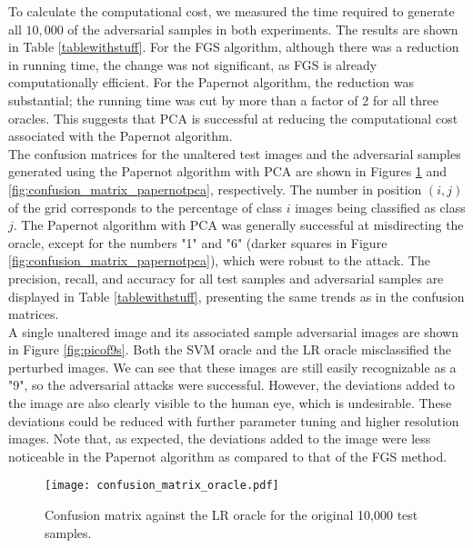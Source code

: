 \indent To calculate the computational cost, we measured the time required to generate all $10,000$ of the adversarial samples in both experiments. The results are shown in Table \ref{tablewithstuff}. For the FGS algorithm, although there was a reduction in running time, the change was not significant, as FGS is already computationally efficient. For the Papernot algorithm, the reduction was substantial; the running time was cut by more than a factor of 2 for all three oracles. This suggests that PCA is successful at reducing the computational cost associated with the Papernot algorithm.\\
\indent The confusion matrices for the unaltered test images and the adversarial samples generated using the Papernot algorithm with PCA are shown in Figures \ref{fig:confusion_matrix_oracle} and \ref{fig:confusion_matrix_papernotpca}, respectively. The number in position $(i, j)$ of the grid corresponds to the percentage of class $i$ images being classified as class $j$. The Papernot algorithm with PCA was generally successful at misdirecting the oracle, except for the numbers "1" and "6" (darker squares in Figure \ref{fig:confusion_matrix_papernotpca}), which were robust to the attack. The precision, recall, and accuracy for all test samples and adversarial samples are displayed in Table \ref{tablewithstuff}, presenting the same trends as in the confusion matrices.\\
\indent A single unaltered image and its associated sample adversarial images are shown in Figure \ref{fig:picof9s}. Both the SVM oracle and the LR oracle misclassified the perturbed images. We can see that these images are still easily recognizable as a "9", so the adversarial attacks were successful. However, the deviations added to the image are also clearly visible to the human eye, which is undesirable. These deviations could be reduced with further parameter tuning and higher resolution images. Note that, as expected, the deviations added to the image were less noticeable in the Papernot algorithm as compared to that of the FGS method. 



\begin{figure}
    \centering
    \texttt{[image: confusion\_matrix\_oracle.pdf]}
    \caption{Confusion matrix against the LR oracle for the original 10,000 test samples.}
    \label{fig:confusion_matrix_oracle}
\end{figure}

